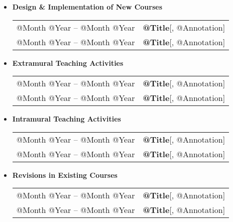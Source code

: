 \documentclass[10pt]{article}
\begin{document}
\begin{IOWA ONLY}
\begin{itemize}
\item[] \textbf{Design \& Implementation of New Courses}
\\[1.3ex]
\begin{tabular}{l@{\quad\ }p{35em}} 
 @Month @Year -- @Month @Year
 & {\bf @Title}[, @Annotation]
 \\[.5ex]
 @Month @Year -- @Month @Year
 & {\bf @Title}[, @Annotation]
 \\[.5ex]
\end{tabular}

\item[] \textbf{Extramural Teaching Activities}
\\[1.3ex]
\begin{tabular}{l@{\quad\ }p{35em}} 
 @Month @Year -- @Month @Year
 & {\bf @Title}[, @Annotation]
 \\[.5ex]
 @Month @Year -- @Month @Year
 & {\bf @Title}[, @Annotation]
 \\[.5ex]
\end{tabular}

\item[] \textbf{Intramural Teaching Activities}
\\[1.3ex]
\begin{tabular}{l@{\quad\ }p{35em}} 
 @Month @Year -- @Month @Year
 & {\bf @Title}[, @Annotation]
 \\[.5ex]
 @Month @Year -- @Month @Year
 & {\bf @Title}[, @Annotation]
 \\[.5ex]
\end{tabular}

\item[] \textbf{Revisions in Existing Courses}
\\[1.3ex]
\begin{tabular}{l@{\quad\ }p{35em}} 
 @Month @Year -- @Month @Year
 & {\bf @Title}[, @Annotation]
 \\[.5ex]
 @Month @Year -- @Month @Year
 & {\bf @Title}[, @Annotation]
 \\[.5ex]
\end{tabular}


\end{itemize}
\end{IOWA ONLY}
\end{document}
